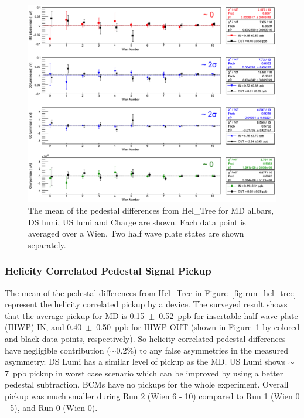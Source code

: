 \begin{singlespace}
\begin{figure}[!h]
	\centering
	\includegraphics[width=15.0cm]{figures/differencesSum}	
	\caption
	{The mean of the pedestal differences from Hel\_Tree for MD allbars, DS lumi, US lumi and Charge are shown. Each data point is averaged over a Wien. Two half wave plate states are shown separately.}
	\label{fig:differencesSum}
\end{figure}
\end{singlespace}

\subsubsection{Helicity Correlated Pedestal Signal Pickup}
\label{Helicity Correlated Pedestal Signal Pickup}
The mean of the pedestal differences from Hel\_Tree in Figure~\ref{fig:run_hel_tree} represent the helicity correlated pickup by a device. The surveyed result shows that the average pickup for MD is 0.15~$\pm$~0.52~ppb for insertable half wave plate (IHWP) IN, and 0.40~$\pm$~0.50~ppb for IHWP OUT (shown in Figure~\ref{fig:differencesSum} by colored and black data points, respectively). So helicity correlated pedestal differences have negligible contribution ($\sim$0.2\%) to any false asymmetries in the measured asymmetry. DS Lumi has a similar level of pickup as the MD. US Lumi shows $\sim$7~ppb pickup in worst case scenario which can be improved by using a better pedestal subtraction. BCMs have no pickups for the whole experiment. Overall pickup was much smaller during Run 2 (Wien 6 - 10) compared to Run 1 (Wien 0 - 5), and Run-0 (Wien 0). 


